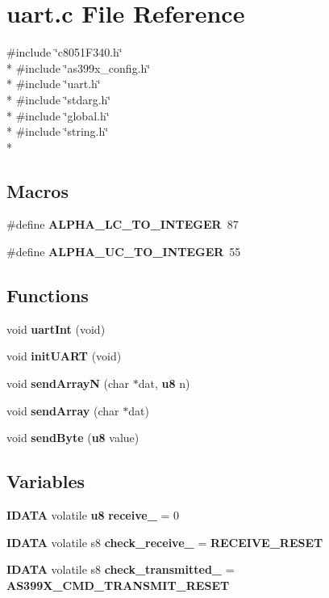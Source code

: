 \section{uart.\-c File Reference}
\label{uart_8c}
{\ttfamily \#include \char`\"{}c8051\-F340.\-h\char`\"{}}\\*
{\ttfamily \#include \char`\"{}as399x\-\_\-config.\-h\char`\"{}}\\*
{\ttfamily \#include \char`\"{}uart.\-h\char`\"{}}\\*
{\ttfamily \#include \char`\"{}stdarg.\-h\char`\"{}}\\*
{\ttfamily \#include \char`\"{}global.\-h\char`\"{}}\\*
{\ttfamily \#include \char`\"{}string.\-h\char`\"{}}\\*
\subsection*{Macros}
\begin{DoxyCompactItemize}
\item 
\#define {\bf A\-L\-P\-H\-A\-\_\-\-L\-C\-\_\-\-T\-O\-\_\-\-I\-N\-T\-E\-G\-E\-R}~87
\item 
\#define {\bf A\-L\-P\-H\-A\-\_\-\-U\-C\-\_\-\-T\-O\-\_\-\-I\-N\-T\-E\-G\-E\-R}~55
\end{DoxyCompactItemize}
\subsection*{Functions}
\begin{DoxyCompactItemize}
\item 
void {\bf uart\-Int} (void)
\item 
void {\bf init\-U\-A\-R\-T} (void)
\item 
void {\bf send\-Array\-N} (char $\ast$dat, {\bf u8} n)
\item 
void {\bf send\-Array} (char $\ast$dat)
\item 
void {\bf send\-Byte} ({\bf u8} value)
\end{DoxyCompactItemize}
\subsection*{Variables}
\begin{DoxyCompactItemize}
\item 
{\bf I\-D\-A\-T\-A} volatile {\bf u8} {\bf receive\-\_\-} = 0
\item 
{\bf I\-D\-A\-T\-A} volatile s8 {\bf check\-\_\-receive\-\_\-} = {\bf R\-E\-C\-E\-I\-V\-E\-\_\-\-R\-E\-S\-E\-T}
\item 
{\bf I\-D\-A\-T\-A} volatile s8 {\bf check\-\_\-transmitted\-\_\-} = {\bf A\-S399\-X\-\_\-\-C\-M\-D\-\_\-\-T\-R\-A\-N\-S\-M\-I\-T\-\_\-\-R\-E\-S\-E\-T}
\end{DoxyCompactItemize}


